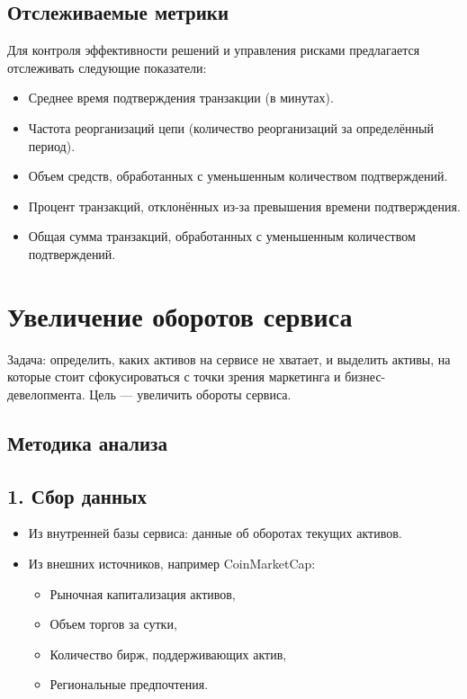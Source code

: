 \documentclass[12pt]{article}
\theoremstyle{indented}
\theoremstyle{definition}
\theoremstyle{remark}
\begin{document}
\subsection*{Отслеживаемые метрики}
Для контроля эффективности решений и управления рисками предлагается отслеживать следующие показатели:
\begin{itemize}
    \item Среднее время подтверждения транзакции (в минутах).
    \item Частота реорганизаций цепи (количество реорганизаций за определённый период).
    \item Объем средств, обработанных с уменьшенным количеством подтверждений.
    \item Процент транзакций, отклонённых из-за превышения времени подтверждения.
    \item Общая сумма транзакций, обработанных с уменьшенным количеством подтверждений.
\end{itemize}

\newpage

\section{Увеличение оборотов сервиса}

Задача: определить, каких активов на сервисе не хватает, и выделить активы, на которые стоит сфокусироваться с точки зрения маркетинга и бизнес-девелопмента. Цель — увеличить обороты сервиса.

\subsection*{Методика анализа}
\subsection*{1. Сбор данных}
\begin{itemize}
    \item Из внутренней базы сервиса: данные об оборотах текущих активов.
    \item Из внешних источников, например CoinMarketCap:
    \begin{itemize}
        \item Рыночная капитализация активов,
        \item Объем торгов за сутки,
        \item Количество бирж, поддерживающих актив,
        \item Региональные предпочтения.
    \end{itemize}
\end{itemize}
\end{document}
